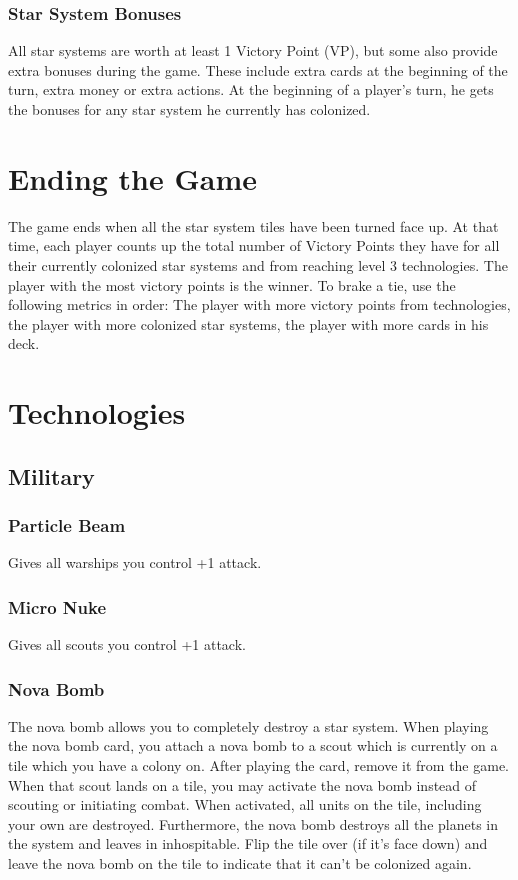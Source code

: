 \documentclass[12pt]{article} %
\begin{document}
\subsubsection{Star System Bonuses}
All star systems are worth at least 1 Victory Point (VP), but some also provide extra bonuses during the game.  These include extra cards at the beginning of the turn, extra money or extra actions.  At the beginning of a player's turn, he gets the bonuses for any star system he currently has colonized.

\section{Ending the Game}
The game ends when all the star system tiles have been turned face up.  At that time, each player counts up the total number of Victory Points they have for all their currently colonized star systems and from reaching level 3 technologies.  The player with the most victory points is the winner.  To brake a tie, use the following metrics in order: The player with more victory points from technologies, the player with more colonized star systems, the player with more cards in his deck.

\section{Technologies}

\subsection{Military}

\subsubsection{Particle Beam}
Gives all warships you control +1 attack.

\subsubsection{Micro Nuke}
Gives all scouts you control +1 attack.

\subsubsection{Nova Bomb}
The nova bomb allows you to completely destroy a star system.  When playing the nova bomb card, you attach a nova bomb to a scout which is currently on a tile which you have a colony on.  After playing the card, remove it from the game.  When that scout lands on a tile, you may activate the nova bomb instead of scouting or initiating combat.  When activated, all units on the tile, including your own are destroyed.  Furthermore, the nova bomb destroys all the planets in the system and leaves in inhospitable.  Flip the tile over (if it's face down) and leave the nova bomb on the tile to indicate that it can't be colonized again. 
\end{document}
